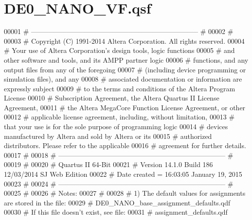 \hypertarget{_d_e0___n_a_n_o___v_f_8qsf_source}{}\section{D\+E0\+\_\+\+N\+A\+N\+O\+\_\+\+V\+F.\+qsf}

\begin{DoxyCode}
00001 \textcolor{keyword}{# -------------------------------------------------------------------------- #}
00002 \textcolor{keyword}{#}
00003 \textcolor{keyword}{# Copyright (C) 1991-2014 Altera Corporation. All rights reserved.}
00004 \textcolor{keyword}{# Your use of Altera Corporation's design tools, logic functions }
00005 \textcolor{keyword}{# and other software and tools, and its AMPP partner logic }
00006 \textcolor{keyword}{# functions, and any output files from any of the foregoing }
00007 \textcolor{keyword}{# (including device programming or simulation files), and any }
00008 \textcolor{keyword}{# associated documentation or information are expressly subject }
00009 \textcolor{keyword}{# to the terms and conditions of the Altera Program License }
00010 \textcolor{keyword}{# Subscription Agreement, the Altera Quartus II License Agreement,}
00011 \textcolor{keyword}{# the Altera MegaCore Function License Agreement, or other }
00012 \textcolor{keyword}{# applicable license agreement, including, without limitation, }
00013 \textcolor{keyword}{# that your use is for the sole purpose of programming logic }
00014 \textcolor{keyword}{# devices manufactured by Altera and sold by Altera or its }
00015 \textcolor{keyword}{# authorized distributors.  Please refer to the applicable }
00016 \textcolor{keyword}{# agreement for further details.}
00017 \textcolor{keyword}{#}
00018 \textcolor{keyword}{# -------------------------------------------------------------------------- #}
00019 \textcolor{keyword}{#}
00020 \textcolor{keyword}{# Quartus II 64-Bit}
00021 \textcolor{keyword}{# Version 14.1.0 Build 186 12/03/2014 SJ Web Edition}
00022 \textcolor{keyword}{# Date created = 16:03:05  January 19, 2015}
00023 \textcolor{keyword}{#}
00024 \textcolor{keyword}{# -------------------------------------------------------------------------- #}
00025 \textcolor{keyword}{#}
00026 \textcolor{keyword}{# Notes:}
00027 \textcolor{keyword}{#}
00028 \textcolor{keyword}{# 1) The default values for assignments are stored in the file:}
00029 \textcolor{keyword}{#       DE0\_NANO\_base\_assignment\_defaults.qdf}
00030 \textcolor{keyword}{#    If this file doesn't exist, see file:}
00031 \textcolor{keyword}{#       assignment\_defaults.qdf}

\end{DoxyCode}
